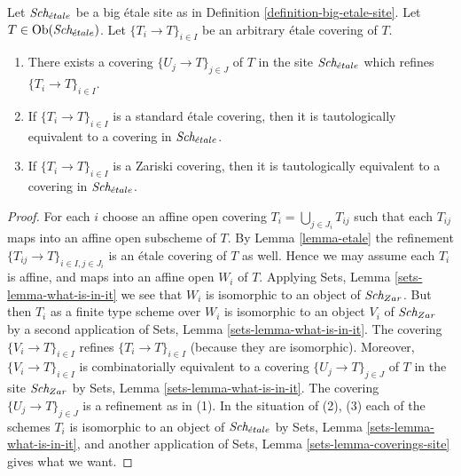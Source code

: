 \begin{lemma}
\label{lemma-etale-induced}
Let $\textit{Sch}_{\acute{e}tale}$ be a big \'etale site as in
Definition \ref{definition-big-etale-site}.
Let $T \in \mathop{\rm Ob}\nolimits(\textit{Sch}_{\acute{e}tale})$.
Let $\{T_i \to T\}_{i \in I}$ be an arbitrary \'etale covering of $T$.
\begin{enumerate}
\item There exists a covering $\{U_j \to T\}_{j \in J}$ of $T$ in the site
$\textit{Sch}_{\acute{e}tale}$ which refines $\{T_i \to T\}_{i \in I}$.
\item If $\{T_i \to T\}_{i \in I}$ is a standard \'etale covering, then
it is tautologically equivalent to a covering in $\textit{Sch}_{\acute{e}tale}$.
\item If $\{T_i \to T\}_{i \in I}$ is a Zariski covering, then
it is tautologically equivalent to a covering in $\textit{Sch}_{\acute{e}tale}$.
\end{enumerate}
\end{lemma}

\begin{proof}
For each $i$ choose an affine open covering $T_i = \bigcup_{j \in J_i} T_{ij}$
such that each $T_{ij}$ maps into an affine open subscheme of $T$. By
Lemma \ref{lemma-etale}
the refinement $\{T_{ij} \to T\}_{i \in I, j \in J_i}$ is an \'etale covering
of $T$ as well. Hence we may assume each $T_i$ is affine, and maps into
an affine open $W_i$ of $T$. Applying
Sets, Lemma \ref{sets-lemma-what-is-in-it}
we see that $W_i$ is isomorphic to an object of $\textit{Sch}_{Zar}$.
But then $T_i$ as a finite type scheme over $W_i$
is isomorphic to an object $V_i$ of $\textit{Sch}_{Zar}$ by a second
application of
Sets, Lemma \ref{sets-lemma-what-is-in-it}.
The covering $\{V_i \to T\}_{i \in I}$ refines $\{T_i \to T\}_{i \in I}$
(because they are isomorphic).
Moreover, $\{V_i \to T\}_{i \in I}$ is combinatorially equivalent to a
covering $\{U_j \to T\}_{j \in J}$ of $T$ in the site
$\textit{Sch}_{Zar}$ by
Sets, Lemma \ref{sets-lemma-what-is-in-it}.
The covering $\{U_j \to T\}_{j \in J}$ is a refinement as in (1).
In the situation of (2), (3) each of the
schemes $T_i$ is isomorphic to an object of $\textit{Sch}_{\acute{e}tale}$ by
Sets, Lemma \ref{sets-lemma-what-is-in-it},
and another application of
Sets, Lemma \ref{sets-lemma-coverings-site}
gives what we want.
\end{proof}

